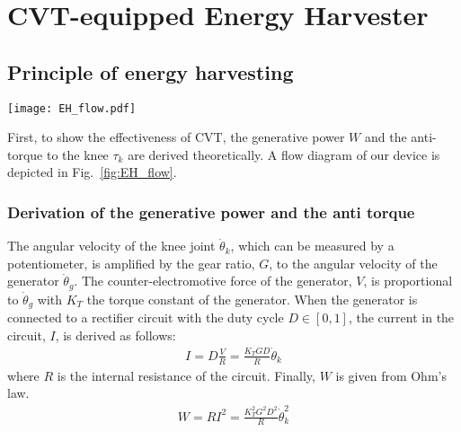 \documentclass[twocolumn]{svjour3}          %
\begin{document}


\section{CVT-equipped Energy Harvester}
\label{sec:development}
%
\subsection{Principle of energy harvesting}
\label{subsec:principle}

\begin{figure*}[tb]
    \centering
    \texttt{[image: EH\_flow.pdf]}
    \caption{Flow diagram of energy harvesting:
    the human motion is measured by a potentiometer;
    the knee joint motion is transmitted to the generator and converted to the generative power;
    on the other hand, the generative power (current) is converted to the anti torque to the knee joint.
    }
    \label{fig:EH_flow}
\end{figure*}

First, to show the effectiveness of CVT, the generative power $W$ and the anti-torque to the knee $\tau_k$ are derived theoretically.
A flow diagram of our device is depicted in Fig.~\ref{fig:EH_flow}.

\subsubsection{Derivation of the generative power and the anti torque}

The angular velocity of the knee joint $\dot{\theta}_k$, which can be measured by a potentiometer, is amplified by the gear ratio, $G$, to the angular velocity of the generator $\dot{\theta}_g$.
The counter-electromotive force of the generator, $V$, is proportional to $\dot{\theta}_g$ with $K_T$ the torque constant of the generator.
When the generator is connected to a rectifier circuit with the duty cycle $D \in [0, 1]$, the current in the circuit, $I$, is derived as follows:
\begin{align}
    I = D \frac{V}{R} = \frac{K_T G D}{R} \dot{\theta}_k
    \label{eq:V2I}
\end{align}
where $R$ is the internal resistance of the circuit.
Finally, $W$ is given from Ohm's law.
\begin{align}
    W = R I^2 = \frac{K_T^2 G^2 D^2}{R} \dot{\theta}_k^2
    \label{eq:watt}
\end{align}
\end{document}
